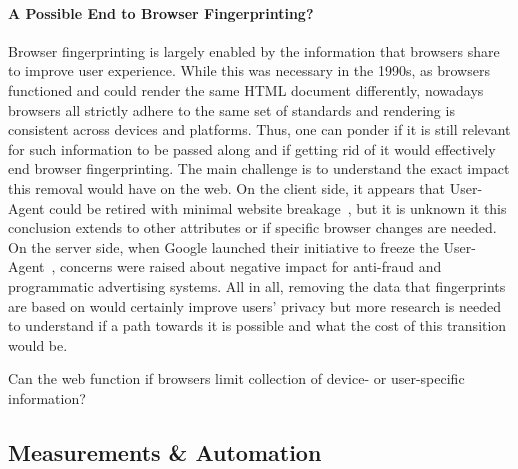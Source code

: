 
\paragraph{A Possible End to Browser Fingerprinting?}
Browser fingerprinting is largely enabled by the information that browsers share to improve user experience. While this was necessary in the 1990s, as browsers functioned and could render the same HTML document differently, nowadays browsers all strictly adhere to the same set of standards and rendering is consistent across devices and platforms. Thus, one can ponder if it is still relevant for such information to be passed along and if getting rid of it would effectively end browser fingerprinting.
%
The main challenge is to understand the exact impact this removal would have on the web. On the client side, it appears that User-Agent could be retired with minimal website breakage~\cite{intumwayaseUARadarExploringImpact2023}, but it is unknown it this conclusion extends to other attributes or if specific browser changes are needed. On the server side, when Google launched their initiative to freeze the User-Agent~\cite{weissIntentDeprecateFreeze2020}, concerns were raised about negative impact for anti-fraud and programmatic advertising systems.
%
All in all, removing the data that fingerprints are based on would certainly improve users' privacy but more research is needed to understand if a path towards it is possible and what the cost of this transition would be.

\begin{opbox}
Can the web function if browsers limit collection of device- or user-specific information?
\end{opbox}


\subsection{Measurements \& Automation}

